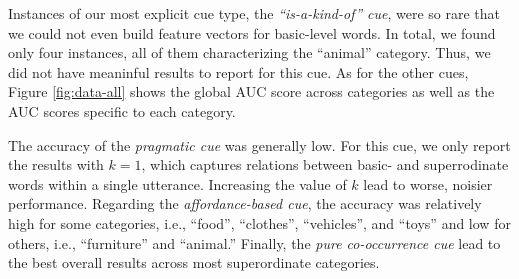\documentclass[english,,man,floatsintext]{apa6}
\begin{document}
Instances of our most explicit cue type, the \emph{\enquote{is-a-kind-of} cue}, were so rare that we could not even build feature vectors for basic-level words. In total, we found only four instances, all of them characterizing the \enquote{animal} category. Thus, we did not have meaninful results to report for this cue. As for the other cues, Figure \ref{fig:data-all} shows the global AUC score across categories as well as the AUC scores specific to each category.

The accuracy of the \emph{pragmatic cue} was generally low. For this cue, we only report the results with \(k=1\), which captures relations between basic- and superrodinate words within a single utterance. Increasing the value of \(k\) lead to worse, noisier performance. Regarding the \emph{affordance-based cue}, the accuracy was relatively high for some categories, i.e., \enquote{food}, \enquote{clothes}, \enquote{vehicles}, and \enquote{toys} and low for others, i.e., \enquote{furniture} and \enquote{animal.} Finally, the \emph{pure co-occurrence cue} lead to the best overall results across most superordinate categories.
\end{document}
